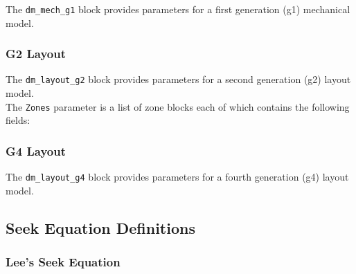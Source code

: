 The \texttt{dm\_mech\_g1} block provides parameters for a first
generation (g1) mechanical model.\\




\subsubsection{G2 Layout}

The \texttt{dm\_layout\_g2} block provides parameters for a second
generation (g2) layout model.\\



The \texttt{Zones} parameter is a list of zone blocks each of which
contains the following fields:\\




\subsubsection{G4 Layout}

The \texttt{dm\_layout\_g4} block provides parameters for a fourth
generation (g4) layout model.\\



\subsection{Seek Equation Definitions}


\subsubsection{Lee's Seek Equation}
\label{seek.lee}

